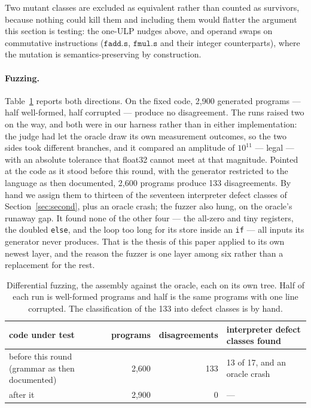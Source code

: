 \documentclass[11pt]{article}
\begin{document}
Two mutant classes are excluded as equivalent rather than counted as survivors, because
nothing could kill them and including them would flatter the argument this section is
testing: the one-ULP nudges above, and operand swaps on commutative instructions
($\texttt{fadd.s}$, $\texttt{fmul.s}$ and their integer counterparts), where the mutation
is semantics-preserving by construction.

\paragraph{Fuzzing.} Table~\ref{tab:fuzz} reports both directions. On the fixed code,
2{,}900 generated programs --- half well-formed, half corrupted --- produce no
disagreement. The runs raised two on the way, and both were in our harness rather than in
either implementation: the judge had let the oracle draw its own measurement outcomes, so
the two sides took different branches, and it compared an amplitude of $10^{11}$ --- legal ---
with an absolute tolerance that float32 cannot meet at that magnitude. Pointed at the code
as it stood before this round, with the generator restricted to the language as then
documented, 2{,}600 programs produce 133 disagreements. By hand we assign them to thirteen
of the seventeen interpreter defect classes of Section~\ref{sec:second}, plus an oracle
crash; the fuzzer also hung, on the oracle's runaway gap. It found none of the other four
--- the all-zero and tiny registers, the doubled \texttt{else}, and the loop too long for its
store inside an \texttt{if} --- all inputs its generator never produces. That is the thesis
of this paper applied to its own newest layer, and the reason the fuzzer is one layer among
six rather than a replacement for the rest.

\begin{table}[t]
\centering
\begin{tabular}{lrrl}
\toprule
code under test & programs & disagreements & interpreter defect classes found \\
\midrule
before this round (grammar as then documented) & 2{,}600 & 133 & 13 of 17, and an oracle crash \\
after it                                       & 2{,}900 & 0 & --- \\
\bottomrule
\end{tabular}
\caption{Differential fuzzing, the assembly against the oracle, each on its own tree.
Half of each run is well-formed programs and half is the same programs with one line
corrupted. The classification of the 133 into defect classes is by hand.}
\label{tab:fuzz}
\end{table}
\end{document}

